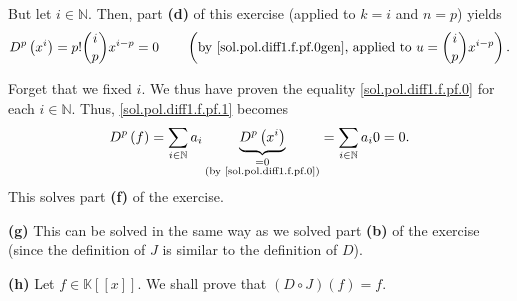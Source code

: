 \documentclass[paper=a4, fontsize=12pt]{scrartcl}%
\let\sumnonlimits\sum
\renewcommand{\sum}{\sumnonlimits\limits}
\theoremstyle{plainsl}
\theoremstyle{definition}
\theoremstyle{remark}
\begin{document}
But let $i\in\mathbb{N}$. Then, part \textbf{(d)} of this exercise (applied to
$k=i$ and $n=p$) yields
\begin{equation}
D^{p}\left(  x^{i}\right)  =p!\dbinom{i}{p}x^{i-p}=0\qquad\left(  \text{by
\eqref{sol.pol.diff1.f.pf.0gen}, applied to }u=\dbinom{i}{p}x^{i-p}\right)  .
\label{sol.pol.diff1.f.pf.0}%
\end{equation}


Forget that we fixed $i$. We thus have proven the equality
\eqref{sol.pol.diff1.f.pf.0} for each $i\in\mathbb{N}$. Thus,
\eqref{sol.pol.diff1.f.pf.1} becomes%
\[
D^{p}\left(  f\right)  =\sum_{i\in\mathbb{N}}a_{i}\underbrace{D^{p}\left(
x^{i}\right)  }_{\substack{=0\\\text{(by \eqref{sol.pol.diff1.f.pf.0})}}%
}=\sum_{i\in\mathbb{N}}a_{i}0=0.
\]
This solves part \textbf{(f)} of the exercise.

\bigskip

\textbf{(g)} This can be solved in the same way as we solved part \textbf{(b)}
of the exercise (since the definition of $J$ is similar to the definition of
$D$).

\bigskip

\textbf{(h)} Let $f\in\mathbb{K}\left[  \left[  x\right]  \right]  $. We shall
prove that $\left(  D\circ J\right)  \left(  f\right)  =f$.
\end{document}
